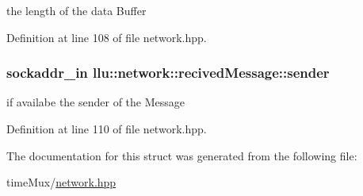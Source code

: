 the length of the data Buffer 



Definition at line 108 of file network.\+hpp.

\hypertarget{structllu_1_1network_1_1recived_message_a3e4538771244b3008f889a03a587c81b}{
\subsubsection[{sender}]{\setlength{\rightskip}{0pt plus 5cm}sockaddr\+\_\+in llu\+::network\+::recived\+Message\+::sender}}\label{structllu_1_1network_1_1recived_message_a3e4538771244b3008f889a03a587c81b}


if availabe the sender of the Message 



Definition at line 110 of file network.\+hpp.



The documentation for this struct was generated from the following file\+:\begin{DoxyCompactItemize}
\item 
time\+Mux/\hyperlink{network_8hpp}{network.\+hpp}\end{DoxyCompactItemize}
